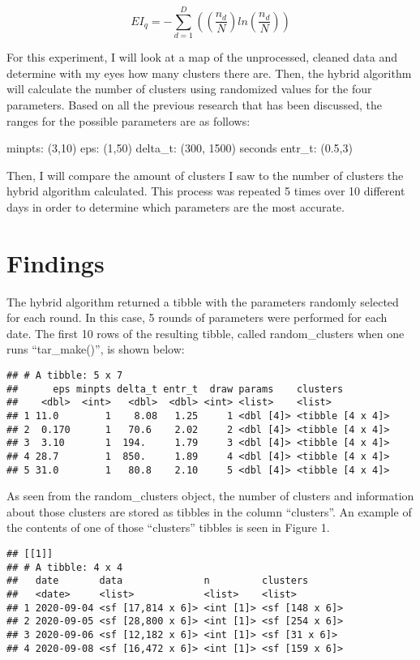 \documentclass[3p, authoryear]{elsarticle} %
\begin{document}
\begin{equation}
  EI_q = -\sum_{d=1}^D ((\frac{n_d}{N})ln(\frac{n_d}{N}))
\end{equation}

For this experiment, I will look at a map of the unprocessed, cleaned data and determine with my eyes how many clusters there are. Then, the hybrid algorithm will calculate the number of clusters using randomized values for the four parameters. Based on all the previous research that has been discussed, the ranges for the possible parameters are as follows:

minpts: (3,10)
eps: (1,50)
delta\_t: (300, 1500) seconds
entr\_t: (0.5,3)

Then, I will compare the amount of clusters I saw to the number of clusters the hybrid algorithm calculated. This process was repeated 5 times over 10 different days in order to determine which parameters are the most accurate.

\hypertarget{findings}{%
\section{Findings}\label{findings}}

The hybrid algorithm returned a tibble with the parameters randomly selected for each round. In this case, 5 rounds of parameters were performed for each date. The first 10 rows of the resulting tibble, called random\_clusters when one runs ``tar\_make()'', is shown below:

\begin{verbatim}
## # A tibble: 5 x 7
##      eps minpts delta_t entr_t  draw params    clusters        
##    <dbl>  <int>   <dbl>  <dbl> <int> <list>    <list>          
## 1 11.0        1    8.08   1.25     1 <dbl [4]> <tibble [4 x 4]>
## 2  0.170      1   70.6    2.02     2 <dbl [4]> <tibble [4 x 4]>
## 3  3.10       1  194.     1.79     3 <dbl [4]> <tibble [4 x 4]>
## 4 28.7        1  850.     1.89     4 <dbl [4]> <tibble [4 x 4]>
## 5 31.0        1   80.8    2.10     5 <dbl [4]> <tibble [4 x 4]>
\end{verbatim}

As seen from the random\_clusters object, the number of clusters and information about those clusters are stored as tibbles in the column ``clusters''. An example of the contents of one of those ``clusters'' tibbles is seen in Figure 1.

\begin{verbatim}
## [[1]]
## # A tibble: 4 x 4
##   date       data              n         clusters      
##   <date>     <list>            <list>    <list>        
## 1 2020-09-04 <sf [17,814 x 6]> <int [1]> <sf [148 x 6]>
## 2 2020-09-05 <sf [28,800 x 6]> <int [1]> <sf [254 x 6]>
## 3 2020-09-06 <sf [12,182 x 6]> <int [1]> <sf [31 x 6]> 
## 4 2020-09-08 <sf [16,472 x 6]> <int [1]> <sf [159 x 6]>
\end{verbatim}
\end{document}
